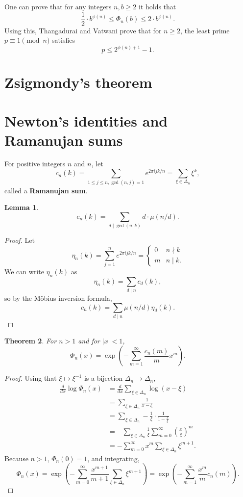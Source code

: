 \documentclass{article}
\newtheorem{theorem}{Theorem}
\newtheorem{lemma}[theorem]{Lemma}
\theoremstyle{definition}
\begin{document}
One can prove that for any integers $n,b \geq 2$ it holds that
\[
\frac{1}{2} \cdot b^{\phi(n)} \leq \Phi_n(b) \leq 2\cdot b^{\phi(n)}.
\]
Using this, Thangadurai and Vatwani \cite{thangadurai} prove that
for $n \geq 2$, the least prime $p \equiv 1 \pmod{n}$ satisfies
\[
p \leq 2^{\phi(n)+1}-1.
\]



\section{Zsigmondy's theorem}

\cite[pp.~167--169, \S 8.3.1]{everest}


\section{Newton's identities and Ramanujan sums}
For positive integers $n$ and $n$,
let
\[
c_n(k) = \sum_{1 \leq j \leq n, \gcd(n,j)=1} e^{2\pi ijk/n} = \sum_{\xi \in \Delta_n} \xi^k,
\]
called a \textbf{Ramanujan sum}.


\begin{lemma}
\[
c_n(k) = \sum_{d \mid \gcd(n,k)} d\cdot \mu(n/d).
\]
\label{ramanujanmobius}
\end{lemma}
\begin{proof}
Let
\[
\eta_n(k) = \sum_{j=1}^n e^{2\pi ijk/n} 
=\begin{cases}
0&n \nmid k\\
m&n \mid k.
\end{cases}
\]
We can write $\eta_n(k)$ as
\[
\eta_n(k) = \sum_{d \mid n} c_d(k),
\]
so by the M\"obius inversion formula, 
\[
c_n(k) = \sum_{d \mid n} \mu(n/d) \eta_d(k).
\]
\end{proof}



\begin{theorem}
For $n>1$ and for $|x|<1$,
\[
\Phi_n(x) = \exp\left(
-\sum_{m=1}^\infty \frac{c_n(m)}{m} x^m\right).
\]
\label{ramanujanexp}
\end{theorem}
\begin{proof}
Using that $\xi \mapsto \xi^{-1}$ is a bijection $\Delta_n \to \Delta_n$,
\begin{align*}
 \frac{d}{dx} \log \Phi_n(x)&=\frac{d}{dx} \sum_{\xi \in \Delta_n} \log (x-\xi)\\
&=\sum_{\xi \in \Delta_n} \frac{1}{x-\xi}\\
&=\sum_{\xi \in \Delta_n} -\frac{1}{\xi} \cdot \frac{1}{1-\frac{x}{\xi}}\\
&=- \sum_{\xi \in \Delta_n} \frac{1}{\xi} \sum_{m=0}^\infty \left(\frac{x}{\xi}\right)^m\\
&=-\sum_{m=0}^\infty x^m \sum_{\xi \in \Delta_n} \xi^{m+1}.
\end{align*}
Because $n>1$, $\Phi_n(0)=1$, and integrating,
\[
\Phi_n(x) = \exp\left( -\sum_{m=0}^\infty \frac{x^{m+1}}{m+1} \sum_{\xi \in \Delta_n} \xi^{m+1}\right)
=\exp\left(-\sum_{m=1}^\infty \frac{x^m}{m} c_n(m)\right).
\]
\end{proof}
\end{document}
